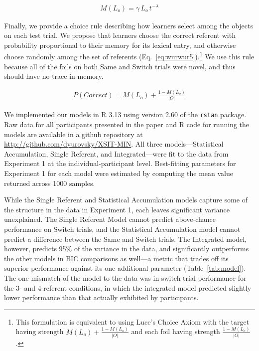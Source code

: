 \documentclass[man,floatsintext]{apa6}
\begin{document}
\begin{align}
M(L_{o}) = \gamma \, L_{o} \, t^{-\lambda} \label{eq:wurwur4}
\end{align}

Finally, we provide a choice rule describing how learners select among the objects on each test trial. We propose that learners choose the correct referent with probability proportional to their memory for its lexical entry, and otherwise choose randomly among the set of referents (Eq.~\ref{eq:wurwur5}).\footnote{This formulation is equivalent to using Luce's Choice Axiom \cite{Luce1959} with the target having strength  $M(L_{o}) + \frac{1-M(L_{o})}{|O|}$ and each foil having strength $\frac{1-M(L_{o})}{|O|}$.} We use this rule because all of the foils on both Same and Switch trials were novel, and thus should have no trace in memory.

\begin{align}
P(Correct) = M(L_{o}) + \frac{1-M(L_{o})}{|O|} \label{eq:wurwur5}
\end{align}

We implemented our models in R 3.13 using version 2.60 of the \texttt{rstan} package. Raw data for all participants presented in the paper and R code for running the models are available in a github repository at \url{http://github.com/dyurovsky/XSIT-MIN}. All three models---Statistical Accumulation, Single Referent, and Integrated---were fit to the data from Experiment 1 at the individual-participant level. Best-fitting parameters for Experiment 1 for each model were estimated by computing the mean value returned across 1000 samples.

While the Single Referent and Statistical Accumulation models capture some of the structure in the data in Experiment 1, each leaves significant variance unexplained. The Single Referent Model cannot predict above-chance performance on Switch trials, and the Statistical Accumulation model cannot predict a difference between the Same and Switch trials. The Integrated model, however, predicts 95\% of the variance in the data, and significantly outperforms the other models in BIC comparisons as well---a metric that trades off its superior performance against its one additional parameter (Table~\ref{tab:model}). The one mismatch of the model to the data was in switch trial performance for the 3- and 4-referent conditions, in which the integrated model predicted slightly lower performance than that actually exhibited by participants. 
\end{document}
